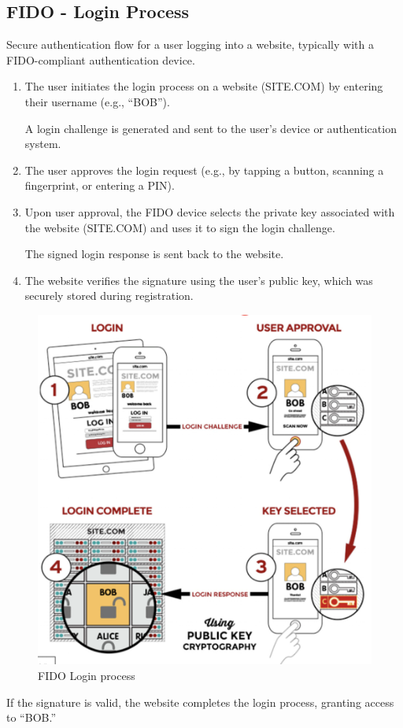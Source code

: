 \subsection*{FIDO - Login Process}
Secure authentication flow for a user logging into a website, typically with a FIDO-compliant authentication device.
\begin{multicols}{2}

    \begin{enumerate}
        \item The user initiates the login process on a website (SITE.COM) by entering their username (e.g., “BOB”).

        A login challenge is generated and sent to the user’s device or authentication system.
        \item The user approves the login request (e.g., by tapping a button, scanning a fingerprint, or entering a PIN).
        \item Upon user approval, the FIDO device selects the private key associated with the website (SITE.COM) and uses it to sign the login challenge.
        
        The signed login response is sent back to the website.
        \item The website verifies the signature using the user’s public key, which was securely stored during registration.
    \end{enumerate}
    \columnbreak

    \begin{figure}[H]
        \centering
        \includegraphics[width=\linewidth]{Images/Authentication/fidolog.png}
        \caption{FIDO Login process}
    \end{figure}
    
\end{multicols}
If the signature is valid, the website completes the login process, granting access to “BOB.”
\clearpage
